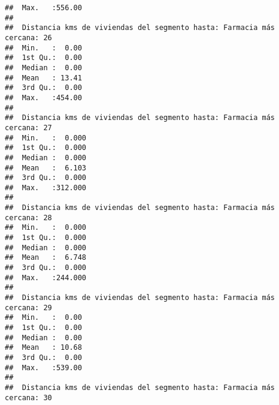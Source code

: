 \documentclass[11pt,]{article}
\begin{document}
\begin{verbatim}
##  Max.   :556.00                                                         
##                                                                         
##  Distancia kms de viviendas del segmento hasta: Farmacia más cercana: 26
##  Min.   :  0.00                                                         
##  1st Qu.:  0.00                                                         
##  Median :  0.00                                                         
##  Mean   : 13.41                                                         
##  3rd Qu.:  0.00                                                         
##  Max.   :454.00                                                         
##                                                                         
##  Distancia kms de viviendas del segmento hasta: Farmacia más cercana: 27
##  Min.   :  0.000                                                        
##  1st Qu.:  0.000                                                        
##  Median :  0.000                                                        
##  Mean   :  6.103                                                        
##  3rd Qu.:  0.000                                                        
##  Max.   :312.000                                                        
##                                                                         
##  Distancia kms de viviendas del segmento hasta: Farmacia más cercana: 28
##  Min.   :  0.000                                                        
##  1st Qu.:  0.000                                                        
##  Median :  0.000                                                        
##  Mean   :  6.748                                                        
##  3rd Qu.:  0.000                                                        
##  Max.   :244.000                                                        
##                                                                         
##  Distancia kms de viviendas del segmento hasta: Farmacia más cercana: 29
##  Min.   :  0.00                                                         
##  1st Qu.:  0.00                                                         
##  Median :  0.00                                                         
##  Mean   : 10.68                                                         
##  3rd Qu.:  0.00                                                         
##  Max.   :539.00                                                         
##                                                                         
##  Distancia kms de viviendas del segmento hasta: Farmacia más cercana: 30

\end{verbatim}
\end{document}
